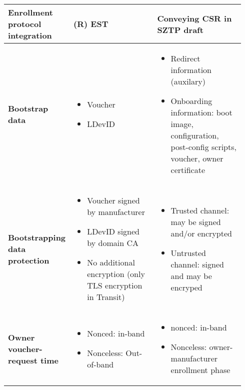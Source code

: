 \begin{longtable}{|m{0.171\linewidth}|m{0.372\linewidth}|m{0.393\linewidth}|}
		\hline
		\rowcolor[rgb]{ .745,  .804,  .843} \textbf{Enrollment protocol integration} & \cellcolor[rgb]{ 1,  1,  1}(R) EST & \cellcolor[rgb]{ 1,  1,  1}Conveying CSR in SZTP draft \cite{sztp-csr-draft} \bigstrut\\

		\hline
		\rowcolor[rgb]{ .745,  .804,  .843} \textbf{Bootstrap data} & \multicolumn{1}{p{18.335em}|}{\cellcolor[rgb]{ 1,  1,  1}
		\begin{itemize}[leftmargin=*, topsep=0pt, noitemsep]
			\item
				Voucher
			\item
				LDevID
		\end{itemize}
		} & \multicolumn{1}{p{18.335em}|}{\cellcolor[rgb]{ 1,  1,  1}
			\begin{itemize}[leftmargin=*, topsep=0pt, noitemsep]
			\item
			Redirect information (auxilary)
			\item
			Onboarding information: boot image, configuration, post-config scripts, voucher, owner certificate
		\end{itemize}
		} \bigstrut\\

		\hline
		\rowcolor[rgb]{ .745,  .804,  .843} \textbf{Bootstrapping data protection} & \multicolumn{1}{p{18.335em}|}{\cellcolor[rgb]{ 1,  1,  1}
			\begin{itemize}[leftmargin=*, topsep=0pt, noitemsep]
			\item
			 Voucher signed by manufacturer
			\item
			 LDevID signed by domain CA
			\item
			 No additional encryption (only TLS encryption in Transit)
		\end{itemize}
		 	} & \multicolumn{1}{p{18.335em}|}{\cellcolor[rgb]{ 1,  1,  1}
			\begin{itemize}[leftmargin=*, topsep=0pt, noitemsep]
			\item
			 Trusted channel: may be signed and/or encrypted
			\item
			 Untrusted channel: signed and may be encryped
		\end{itemize}
		 } \bigstrut\\

		\hline
		\rowcolor[rgb]{ .745,  .804,  .843} \textbf{Owner voucher-request time} & \multicolumn{1}{p{18.335em}|}{\cellcolor[rgb]{ 1,  1,  1}
		\begin{itemize}[leftmargin=*, topsep=0pt, noitemsep]
		\item
			Nonced: in-band
		\item
			Nonceless: Out-of-band
		\end{itemize}
		} & \multicolumn{1}{p{18.335em}|}{\cellcolor[rgb]{ 1,  1,  1}
		\begin{itemize}[leftmargin=*, topsep=0pt, noitemsep]
		\item
			nonced: in-band
		\item
			Nonceless: owner-manufacturer enrollment phase
		\end{itemize}
	} \bigstrut\\


\end{longtable}
